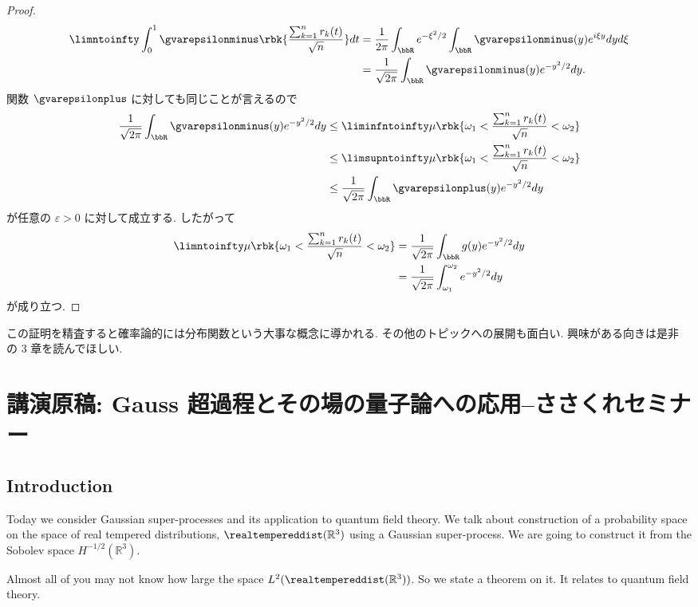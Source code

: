 \documentclass[openany, a4paper, oneside]{jsbook}
\begin{document}
\begin{proof}
\begin{align}
 \limntoinfty \int_0^1 \gvarepsilonminus \rbk{\frac{\sum_{k=1}^{n} r_k (t)}{\sqrt{n}}} dt
 &=
 \frac{1}{2 \pi} \int_{\bbR} e^{- \xi^2 / 2} \int_{\bbR} \gvarepsilonminus (y) e^{i \xi y} dy d\xi \\
 &=
 \frac{1}{\sqrt{2 \pi}} \int_{\bbR} \gvarepsilonminus (y) e^{- y^2 / 2} dy.
\end{align}
関数 $\gvarepsilonplus$ に対しても同じことが言えるので
\begin{align}
 \frac{1}{\sqrt{2 \pi}} \int_{\bbR} \gvarepsilonminus (y) e^{- y^2 / 2} dy
 &\leq
 \liminfntoinfty \mu \rbk{\omega_1 < \frac{\sum_{k=1}^{n} r_k (t)}{\sqrt{n}} < \omega_2} \\
 &\leq
 \limsupntoinfty \mu \rbk{\omega_1 < \frac{\sum_{k=1}^{n} r_k (t)}{\sqrt{n}} < \omega_2} \\
 &\leq
 \frac{1}{\sqrt{2 \pi}} \int_{\bbR} \gvarepsilonplus (y) e^{- y^2 / 2} dy
\end{align}
が任意の $\varepsilon > 0$ に対して成立する.
したがって
\begin{align}
 \limntoinfty \mu \rbk{\omega_1 < \frac{\sum_{k=1}^{n} r_k (t)}{\sqrt{n}} < \omega_2}
 &=
 \frac{1}{\sqrt{2 \pi}} \int_{\bbR} g (y) e^{- y^2 / 2} dy \\
 &=
 \frac{1}{\sqrt{2 \pi}} \int_{\omega_1}^{\omega_2} e^{- y^2 / 2} dy
\end{align}
が成り立つ.
\end{proof}

この証明を精査すると確率論的には分布関数という大事な概念に導かれる.
その他のトピックへの展開も面白い.
興味がある向きは是非 \cite{MarkKac1} の 3 章を読んでほしい.
\chapter{講演原稿: Gauss 超過程とその場の量子論への応用--ささくれセミナー}

\section{Introduction}

Today we consider Gaussian super-processes and its application to quantum field theory.
We talk about construction of a probability space on the space of real tempered distributions,
$\realtempereddist (\mathbb{R}^3)$ using a Gaussian super-process.
We are going to construct it from the Sobolev space $H^{-1/2} (\mathbb{R}^3)$.

Almost all of you may not know how large the space $L^2 (\realtempereddist (\mathbb{R}^3))$.
So we state a theorem on it.
It relates to quantum field theory.
\end{document}
